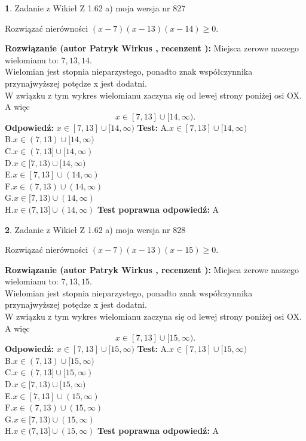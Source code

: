 \documentclass[12pt, a4paper]{article}
\theoremstyle{definition} %
\newtheorem{zad}{}
\newcommand{\zadStart}[1]{\begin{zad}#1\newline}
\newcommand{\zadStop}{\end{zad}}
\newcommand{\rozwStart}[2]{\noindent \textbf{Rozwiązanie (autor #1 , recenzent #2): }\newline}
\newcommand{\rozwStop}{\newline}
\newcommand{\odpStart}{\noindent \textbf{Odpowiedź:}\newline}
\newcommand{\odpStop}{\newline}
\newcommand{\testStart}{\noindent \textbf{Test:}\newline}
\newcommand{\testStop}{\newline}
\newcommand{\kluczStart}{\noindent \textbf{Test poprawna odpowiedź:}\newline}
\newcommand{\kluczStop}{\newline}
\begin{document}
\zadStart{Zadanie z Wikieł Z 1.62 a) moja wersja nr 827}

Rozwiązać nierówności $(x-7)(x-13)(x-14)\ge0$.
\zadStop
\rozwStart{Patryk Wirkus}{}
Miejsca zerowe naszego wielomianu to: $7, 13, 14$.\\
Wielomian jest stopnia nieparzystego, ponadto znak współczynnika przy\linebreak najwyższej potędze x jest dodatni.\\ W związku z tym wykres wielomianu zaczyna się od lewej strony poniżej osi OX. A więc $$x \in [7,13] \cup [14,\infty).$$
\rozwStop
\odpStart
$x \in [7,13] \cup [14,\infty)$
\odpStop
\testStart
A.$x \in [7,13] \cup [14,\infty)$\\
B.$x \in (7,13) \cup [14,\infty)$\\
C.$x \in (7,13] \cup [14,\infty)$\\
D.$x \in [7,13) \cup [14,\infty)$\\
E.$x \in [7,13] \cup (14,\infty)$\\
F.$x \in (7,13) \cup (14,\infty)$\\
G.$x \in [7,13) \cup (14,\infty)$\\
H.$x \in (7,13] \cup (14,\infty)$
\testStop
\kluczStart
A
\kluczStop



\zadStart{Zadanie z Wikieł Z 1.62 a) moja wersja nr 828}

Rozwiązać nierówności $(x-7)(x-13)(x-15)\ge0$.
\zadStop
\rozwStart{Patryk Wirkus}{}
Miejsca zerowe naszego wielomianu to: $7, 13, 15$.\\
Wielomian jest stopnia nieparzystego, ponadto znak współczynnika przy\linebreak najwyższej potędze x jest dodatni.\\ W związku z tym wykres wielomianu zaczyna się od lewej strony poniżej osi OX. A więc $$x \in [7,13] \cup [15,\infty).$$
\rozwStop
\odpStart
$x \in [7,13] \cup [15,\infty)$
\odpStop
\testStart
A.$x \in [7,13] \cup [15,\infty)$\\
B.$x \in (7,13) \cup [15,\infty)$\\
C.$x \in (7,13] \cup [15,\infty)$\\
D.$x \in [7,13) \cup [15,\infty)$\\
E.$x \in [7,13] \cup (15,\infty)$\\
F.$x \in (7,13) \cup (15,\infty)$\\
G.$x \in [7,13) \cup (15,\infty)$\\
H.$x \in (7,13] \cup (15,\infty)$
\testStop
\kluczStart
A
\kluczStop
\end{document}
